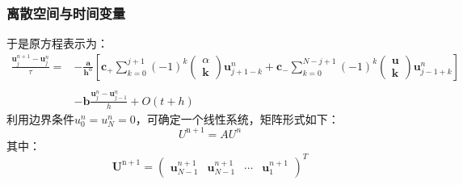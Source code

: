 \documentclass[notheorems,serif]{beamer}
\begin{document}
\begin{frame}
\frametitle{离散空间与时间变量}
\qquad 于是原方程表示为：
\begin{equation}
\begin{aligned}
\frac{\boldsymbol{u}_{j}^{n+1}-\boldsymbol{u}_{j}^{n}}{\tau} = & -\frac{\boldsymbol{a}}{\boldsymbol{h}^{\alpha}}\left[\boldsymbol{c}_{+} \sum_{k=0}^{j+1}(-1)^{k} \left( \begin{array}{c}{\alpha} \\ {\boldsymbol{k}}\end{array}\right) \boldsymbol{u}_{j+1-k}^{n}+\boldsymbol{c}_{-} \sum_{k=0}^{N-j+1}(-1)^{k} \left( \begin{array}{c}{\boldsymbol{u}} \\ {\boldsymbol{k}}\end{array}\right) \boldsymbol{u}_{j-1+k}^{n}\right] \\ \\& -\boldsymbol{b} \frac{\boldsymbol{u}_{j}^{n}-\boldsymbol{u}_{j-1}^{n}}{h} + O(t+h)
\end{aligned}
\end{equation}
\qquad 利用边界条件$u_{0}^{n}=u_{N}^{n}=0$，可确定一个线性系统，矩阵形式如下：
\begin{equation*}
U^{\mathrm{n}+1}=A U^{n}
\end{equation*}
其中：
\begin{equation*}
\boldsymbol{U}^{\mathrm{n}+1}=\left(\begin{array}{cccc}{\boldsymbol{u}_{N-1}^{n+1}} & {\boldsymbol{u}_{N-1}^{n+1}} & {\cdots} & {\boldsymbol{u}_{1}^{n+1}}\end{array}\right)^{T}
\end{equation*}
\end{frame}
\end{document}
